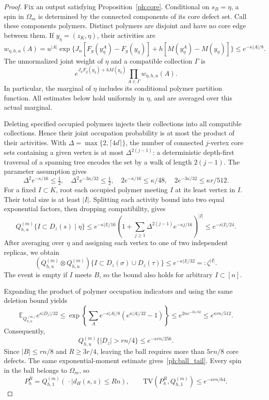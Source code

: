 \documentclass[11pt]{article}
\newcommand{\TV}{\mathrm{TV}}
\def\E{\mathbb{E}}
\numberwithin{equation}{section}
\begin{document}
\begin{proof}
Fix an output satisfying Proposition~\ref{ph:core}. Conditional on $s_B=\eta$, a spin in $\Omega_m$ is determined by the connected components of its core defect set. Call these components polymers. Distinct polymers are disjoint and have no core edge between them. If $y_\eta=(z_K,\eta)$, their activities are
\[
 w_{\eta,h,u}(A)
 =u^{|A|}\exp\{J_n[F_g(y_\eta^A)-F_g(y_\eta)]
                   +h[M(y_\eta^A)-M(y_\eta)]\}
 \le e^{-\kappa|A|/8}.
\]
The unnormalized joint weight of $\eta$ and a compatible collection $\Gamma$ is
\[
    e^{J_nF_g(y_\eta)+hM(y_\eta)}
       \prod_{A\in\Gamma}w_{\eta,h,u}(A).
\]
In particular, the marginal of $\eta$ includes its conditional polymer partition function. All estimates below hold uniformly in $\eta$, and are averaged over this actual marginal.

Deleting specified occupied polymers injects their collections into all compatible collections. Hence their joint occupation probability is at most the product of their activities. With $\Delta=\max\{2,\lceil4d\rceil\}$, the number of connected $j$-vertex core sets containing a given vertex is at most $\Delta^{2(j-1)}$: a deterministic depth-first traversal of a spanning tree encodes the set by a walk of length $2(j-1)$. The parameter assumption gives
\[
 \Delta^2e^{-\kappa/16}\le\tfrac12,
 \quad \Delta^2e^{-3\kappa/32}\le\tfrac12,
 \quad 2e^{-\kappa/16}\le\kappa/48,
 \quad 2e^{-3\kappa/32}\le\kappa r/512.
\]
For a fixed $I\subset K$, root each occupied polymer meeting $I$ at its least vertex in $I$. Their total size is at least $|I|$. Splitting each activity bound into two equal exponential factors, then dropping compatibility, gives
\[
 Q_{h,u}^{(m)}\{I\subset D_z(s)\mid\eta\}
 \le e^{-\kappa|I|/16}
 \left(1+\sum_{j\ge1}\Delta^{2(j-1)}e^{-\kappa j/16}\right)^{|I|}
 \le e^{-\kappa|I|/24}.
\]
After averaging over $\eta$ and assigning each vertex to one of two independent replicas, we obtain
\begin{equation}\label{ph:coverage}
 (Q_{h,u}^{(m)}\otimes Q_{h,u}^{(m)})
 \{I\subset D_z(\sigma)\cup D_z(\tau)\}
 \le e^{-\kappa|I|/32}=:\zeta^{|I|}.
\end{equation}
The event is empty if $I$ meets $B$, so the bound also holds for arbitrary $I\subset[n]$.

Expanding the product of polymer occupation indicators and using the same deletion bound yields
\[
 \E_{Q_{h,u}^{(m)}}e^{\kappa|D_z|/32}
 \le\exp\left\{\sum_A e^{-\kappa|A|/8}
                 (e^{\kappa|A|/32}-1)\right\}
 \le e^{2ne^{-3\kappa/32}}
 \le e^{\kappa rn/512}.
\]
Consequently,
\begin{equation}\label{ph:defect_tail}
    Q_{h,u}^{(m)}\{|D_z|>rn/4\}\le e^{-\kappa rn/256}.
\end{equation}
Since $|B|\le rn/8$ and $R\ge3r/4$, leaving the ball requires more than $5rn/8$ core defects. The same exponential-moment estimate gives~\eqref{ph:ball_tail}. Every spin in the ball belongs to $\Omega_m$, so
\begin{equation}\label{ph:conditioning}
    P_h^R=Q_{h,1}^{(m)}(\,\cdot\mid d_H(s,z)\le Rn),
    \qquad \TV(P_h^R,Q_{h,1}^{(m)})\le e^{-\kappa rn/64}.
\end{equation}


\end{proof}
\end{document}

